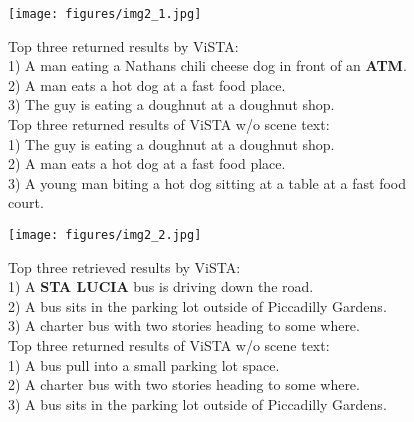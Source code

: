 \documentclass[10pt,twocolumn,letterpaper]{article}
\begin{document}
\begin{figure*}
  \begin{subfigure}{.32\textwidth}
    \centering
    \texttt{[image: figures/img2\_1.jpg]}
    \caption{Top three returned results by ViSTA:\\
    \tiny
    1) A man eating a Nathans chili cheese dog in front of an \textbf{ATM}. \textcolor{red}{\CheckmarkBold} \\
    2) A man eats a hot dog at a fast food place. \textcolor{blue}{\XSolidBrush}\\
    3) The guy is eating a doughnut at a doughnut shop. \textcolor{blue}{\XSolidBrush} \vspace{5pt} \\ 
    \scriptsize
    Top three returned results of ViSTA w/o scene text:\\
    \tiny
    1) The guy is eating a doughnut at a doughnut shop. \textcolor{blue}{\XSolidBrush} \\
    2) A man eats a hot dog at a fast food place. \textcolor{blue}{\XSolidBrush}\\
    3) A young man biting a hot dog sitting at a table at a fast food court. \textcolor{red}{\CheckmarkBold}
    }
    \label{sf1}
  \end{subfigure}
  \hspace{3pt}
  \begin{subfigure}{.32\textwidth}
    \centering
    \texttt{[image: figures/img2\_2.jpg]}
    \caption{Top three retrieved results by ViSTA:\\
    \tiny
    1) A \textbf{STA LUCIA} bus is driving down the road. \textcolor{red}{\CheckmarkBold}\\
    2) A bus sits in the parking lot outside of Piccadilly Gardens. \textcolor{blue}{\XSolidBrush}\\
    3) A charter bus with two stories heading to some where. \textcolor{blue}{\XSolidBrush} \vspace{5pt}\\
    \scriptsize
    Top three returned results of ViSTA w/o scene text:\\
    \tiny
    1) A bus pull into a small parking lot space. \textcolor{blue}{\XSolidBrush} \\
    2) A charter bus with two stories heading to some  where.\textcolor{blue}{\XSolidBrush} \\
    3) A bus sits in the parking lot outside of Piccadilly Gardens. \textcolor{blue}{\XSolidBrush}}

\end{subfigure}
\end{figure*}
\end{document}
